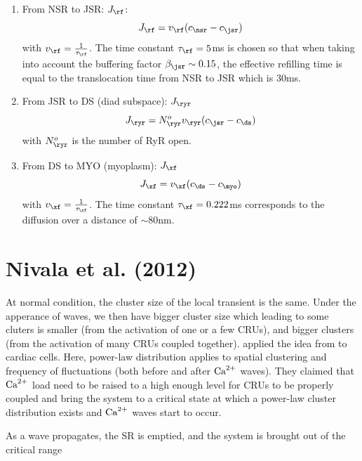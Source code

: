 \begin{enumerate}
\item From NSR to JSR: $J_\rf$:
  \begin{equation}
    \label{eq:946}
    J_\rf= v_\rf (c_\nsr - c_\jsr)
  \end{equation}
  with $v_\rf = \frac{1}{\tau_\rf}$. The time constant $\tau_\rf=5$ms
  is chosen so that when taking into account the buffering factor
  $\beta_\jsr\sim 0.15$, the effective refilling time is equal to the
  translocation time from NSR to JSR which is 30ms.


\item From JSR to DS (diad subspace): $J_\ryr$
  \begin{equation}
    \label{eq:948}
    J_\ryr = N_\ryr^o v_\ryr (c_\jsr - c_\ds)
  \end{equation}
with $N_\ryr^o$ is the number of RyR open. 

\item From DS to MYO (myoplasm): $J_\xf$
  \begin{equation}
    \label{eq:947}
    J_\xf= v_\xf (c_\ds - c_\myo)
  \end{equation}
with $v_\xf = \frac{1}{\tau_\xf}$. The time constant
$\tau_\xf=0.222$ms corresponds to the diffusion over a distance of
$\sim 80$nm. 
\end{enumerate}


\section{Nivala et al. (2012)}
\label{sec:nivala2012}

At normal condition, the cluster size of the local transient is the same. Under
the apperance of waves, we then have bigger cluster size which leading to some
cluters is smaller (from the activation of one or a few CRUs), and bigger
clusters (from the activation of many CRUs coupled together). \citep{nivala2012}
applied the idea from \citep{yang2006} to cardiac cells.
Here, power-law distribution applies to spatial clustering and frequency of
fluctuations (both before and after ${\text{Ca}^{2+}}$ waves). They claimed that ${\text{Ca}^{2+}}$ load
need to be raised to a high enough level for CRUs to be properly coupled and
bring the system to a critical state at which a power-law cluster distribution
exists and ${\text{Ca}^{2+}}$ waves start to occur.

As a wave propagates, the SR is emptied, and the system is brought out of the
critical range




